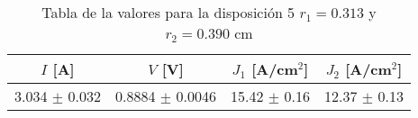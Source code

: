 \begin{table}[H]
    \centering
\begin{tabular}{cccc}
\toprule
$I$ [A] & $V$ [V] & $J_1$ [A/cm$^2$] & $J_2$ [A/cm$^2$] \\
\midrule
3.034 $\pm$ 0.032 & 0.8884 $\pm$ 0.0046 & 15.42 $\pm$ 0.16 & 12.37 $\pm$ 0.13 \\
\bottomrule
\end{tabular}
    \caption{Tabla de la valores para la disposición 5 $r_1=0.313$ y $r_2=0.390$ cm }
    \label{Tab:VIJ_mini_5}
\end{table}

